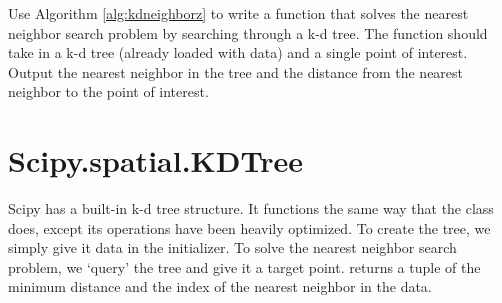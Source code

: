 \begin{problem}
Use Algorithm \ref{alg:kdneighborz} to write a function that solves the nearest neighbor search problem by searching through a k-d tree.
The function should take in a k-d tree (already loaded with data) and a single point of interest.
Output the nearest neighbor in the tree and the distance from the nearest neighbor to the point of interest. 
\end{problem}

\section*{Scipy.spatial.KDTree}

Scipy has a built-in k-d tree structure.
It functions the same way that the  class does, except its operations have been heavily optimized.
To create the tree, we simply give it data in the initializer.
To solve the nearest neighbor search problem, we `query' the tree and give it a target point.
 returns a tuple of the minimum distance and the index of the nearest neighbor in the data.

